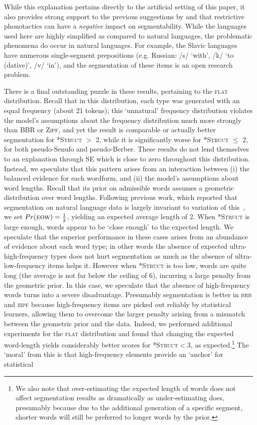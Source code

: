 \documentclass[11pt]{article}
\begin{document}
While this explanation pertains directly to the artificial setting of this paper, it also provides strong support to the previous suggestions by \cite{Daland13a} and \cite{Fourtassi13a} that restrictive phonotactics can have a \emph{negative} impact on segmentability. While the languages used here are highly simplified as compared to natural languages, the problematic phenomena do occur in natural languages. For example, the Slavic languages have numerous single-segment prepositions (e.g. Russian: /s/ `with', /k/ `to (dative)', /v/ `in'), and the segmentation of these items is an open research problem.

There is a final outstanding puzzle in these results, pertaining to the \textsc{flat} distribution. Recall that in this distribution, each type was generated with an equal frequency (about 21 tokens); this `unnatural' frequency distribution violates the model's assumptions about the frequency distribution much more strongly than \textsc{BBR} or \textsc{Zipf}, and yet the result is comparable or actually better segmentation for \textsc{*Struct} $>$ 2, while it is significantly worse for \textsc{*Struct} $\leq$ 2, for both pseudo-Senufo and pseudo-Berber. These results do not lend themselves to an explanation through SE which is close to zero throughout this distribution. Instead, we speculate that this pattern arises from an interaction between (i) the balanced evidence for each wordform, and (ii) the model's assumptions about word lengths. Recall that its prior on admissible words assumes a geometric distribution over word lengths. Following previous work, which reported that segmentation on natural language data is largely invariant to variation of this~\cite{Goldwater09a}, we set $Pr(\textsc{eow}) = \frac{1}{2}$, yielding an expected average length of 2. When \textsc{*Struct} is large enough, words appear to be `close enough' to the expected length. We speculate that the superior performance in these cases arises from an abundance of evidence about each word type; in other words the absence of expected ultra-high-frequency types does not hurt segmentation as much as the absence of ultra-low-frequency items helps it. However when \textsc{*Struct} is too low, words are quite long (the average is not far below the ceiling of 6), incurring a large penalty from the geometric prior. In this case, we speculate that the absence of high-frequency words turns into a severe disadvantage. Presumably segmentation is better in \textsc{brb} and \textsc{zipf} because high-frequency items are picked out reliably by statistical learners, allowing them to overcome the larger penalty arising from a mismatch between the geometric prior and the data. Indeed, we performed additional experiments for the \textsc{flat} distribution and found that changing the expected word-length yields considerably better scores for \textsc{*Struct}$<$3, as expected.\footnote{We also note that over-estimating the expected length of words does not affect segmentation results as dramatically as under-estimating does, presumably because due to the additional generation of a specific segment, shorter words will still be preferred to longer words by the prior.} The `moral' from this is that high-frequency elements provide an `anchor' for statistical 
\end{document}
